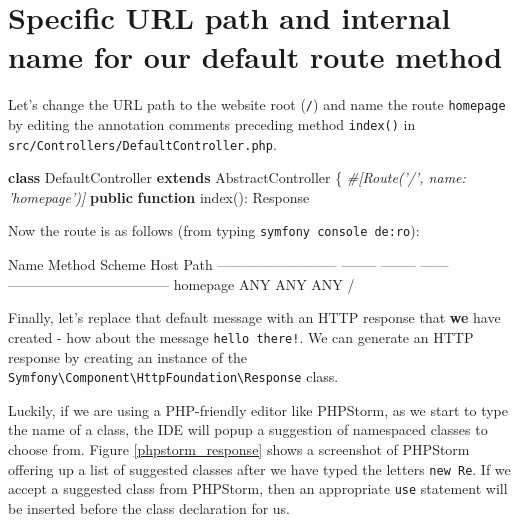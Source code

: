 \documentclass[a4paperpaper,openright]{book}
\newenvironment{Shaded}{}{}
\newcommand{\CommentTok}[1]{\textcolor[rgb]{0.38,0.63,0.69}{\textit{#1}}}
\newcommand{\ExtensionTok}[1]{#1}
\newcommand{\KeywordTok}[1]{\textcolor[rgb]{0.00,0.44,0.13}{\textbf{#1}}}
\newcommand{\NormalTok}[1]{#1}
\newcommand{\OtherTok}[1]{\textcolor[rgb]{0.00,0.44,0.13}{#1}}
\begin{document}
\hypertarget{specific-url-path-and-internal-name-for-our-default-route-method}{%
\section{Specific URL path and internal name for our default route
method}\label{specific-url-path-and-internal-name-for-our-default-route-method}}

Let's change the URL path to the website root (\texttt{/}) and name the
route \texttt{homepage} by editing the annotation comments preceding
method \texttt{index()} in
\texttt{src/Controllers/DefaultController.php}.

\begin{Shaded}
\begin{Highlighting}[]
    \KeywordTok{class}\NormalTok{ DefaultController }\KeywordTok{extends}\NormalTok{ AbstractController}
\NormalTok{    \{}
        \CommentTok{#[Route('/', name: 'homepage')]}
        \KeywordTok{public} \KeywordTok{function}\NormalTok{ index}\OtherTok{()}\NormalTok{: Response}
\end{Highlighting}
\end{Shaded}

Now the route is as follows (from typing
\texttt{symfony\ console\ de:ro}):

\begin{Shaded}
\begin{Highlighting}[]
  \ExtensionTok{Name}\NormalTok{                       Method   Scheme   Host   Path}
 \ExtensionTok{--------------------------}\NormalTok{ -------- -------- ------ -----------------------------------}
  \ExtensionTok{homepage}\NormalTok{                   ANY      ANY      ANY    /}
\end{Highlighting}
\end{Shaded}

Finally, let's replace that default message with an HTTP response that
\textbf{we} have created - how about the message \texttt{hello\ there!}.
We can generate an HTTP response by creating an instance of the
\texttt{Symfony\textbackslash{}Component\textbackslash{}HttpFoundation\textbackslash{}Response}
class.

Luckily, if we are using a PHP-friendly editor like PHPStorm, as we
start to type the name of a class, the IDE will popup a suggestion of
namespaced classes to choose from. Figure \ref{phpstorm_response} shows
a screenshot of PHPStorm offering up a list of suggested classes after
we have typed the letters \texttt{new\ Re}. If we accept a suggested
class from PHPStorm, then an appropriate \texttt{use} statement will be
inserted before the class declaration for us.
\end{document}
